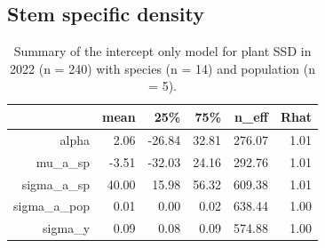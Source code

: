 \documentclass{article}
\begin{document}
\subsection*{Stem specific density}
\begin{table}[ht]
\centering
\caption{Summary of the intercept only model for plant SSD in 2022 (n = 240) with species (n = 14) and population (n = 5).} 
\begin{tabular}{rrrrrr}
  \hline
 & mean & 25\% & 75\% & n\_eff & Rhat \\ 
  \hline
alpha & 2.06 & -26.84 & 32.81 & 276.07 & 1.01 \\ 
  mu\_a\_sp & -3.51 & -32.03 & 24.16 & 292.76 & 1.01 \\ 
  sigma\_a\_sp & 40.00 & 15.98 & 56.32 & 609.38 & 1.01 \\ 
  sigma\_a\_pop & 0.01 & 0.00 & 0.02 & 638.44 & 1.00 \\ 
  sigma\_y & 0.09 & 0.08 & 0.09 & 574.88 & 1.00 \\ 
  \end{tabular}
\end{table}
\end{document}
